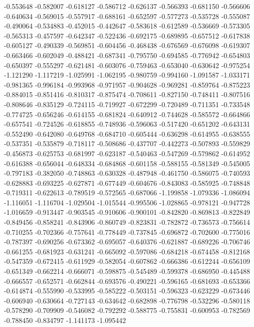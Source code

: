 -0.553648
-0.582007
-0.618127
-0.586712
-0.626137
-0.566393
-0.681150
-0.566606
-0.640634
-0.569015
-0.557917
-0.688161
-0.652597
-0.577273
-0.535728
-0.555087
-0.490064
-0.534883
-0.452015
-0.442647
-0.583618
-0.612589
-0.536669
-0.573305
-0.565313
-0.457597
-0.642347
-0.522436
-0.692175
-0.689895
-0.657512
-0.617838
-0.605127
-0.490339
-0.569851
-0.604456
-0.468438
-0.676569
-0.676098
-0.619307
-0.663466
-0.602049
-0.488421
-0.687341
-0.795750
-0.694585
-0.776942
-0.654803
-0.650397
-0.555297
-0.621481
-0.603076
-0.759463
-0.653040
-0.630642
-0.975254
-1.121290
-1.117219
-1.025991
-1.062195
-0.980759
-0.994160
-1.091587
-1.033171
-0.981365
-0.996184
-0.993968
-0.971957
-0.904628
-0.969281
-0.859764
-0.875223
-0.884015
-0.851416
-0.810317
-0.875474
-0.708611
-0.827150
-0.748411
-0.807516
-0.808646
-0.835129
-0.724115
-0.719927
-0.672299
-0.720489
-0.711351
-0.733548
-0.774725
-0.656246
-0.614155
-0.681824
-0.640912
-0.744628
-0.585572
-0.664866
-0.657541
-0.724526
-0.618855
-0.748936
-0.596063
-0.517420
-0.651202
-0.643131
-0.552490
-0.642080
-0.649768
-0.684710
-0.605444
-0.636298
-0.614955
-0.638555
-0.537351
-0.535879
-0.718117
-0.508686
-0.437707
-0.442273
-0.507893
-0.559829
-0.456873
-0.625753
-0.681997
-0.623187
-0.540463
-0.547269
-0.579862
-0.614952
-0.616388
-0.656044
-0.648334
-0.684868
-0.601158
-0.588155
-0.581349
-0.545005
-0.797183
-0.382050
-0.748863
-0.630328
-0.487948
-0.461750
-0.586075
-0.740593
-0.628883
-0.693225
-0.627871
-0.677449
-0.604676
-0.843083
-0.585925
-0.748848
-0.719311
-0.622613
-0.789519
-0.572565
-0.687066
-1.199858
-1.079336
-1.086094
-1.116051
-1.116704
-1.029504
-1.015544
-0.995506
-1.028865
-0.978121
-0.947728
-1.016659
-0.913447
-0.903545
-0.910606
-0.900101
-0.842820
-0.869813
-0.822849
-0.849456
-0.858241
-0.843906
-0.860749
-0.823831
-0.782872
-0.736573
-0.756614
-0.710255
-0.702366
-0.757641
-0.778449
-0.737845
-0.696872
-0.702600
-0.775016
-0.787397
-0.690256
-0.673362
-0.695057
-0.640376
-0.621887
-0.689226
-0.706746
-0.661255
-0.681923
-0.631241
-0.665092
-0.597086
-0.684218
-0.674458
-0.812168
-0.547359
-0.672415
-0.611929
-0.582054
-0.607862
-0.666386
-0.612244
-0.656109
-0.651349
-0.662214
-0.666071
-0.598875
-0.545489
-0.599378
-0.686950
-0.445488
-0.666557
-0.652571
-0.662844
-0.693576
-0.490221
-0.596165
-0.681693
-0.653366
-0.614874
-0.555990
-0.533995
-0.585222
-0.503151
-0.596323
-0.623229
-0.673446
-0.606940
-0.630664
-0.727143
-0.634642
-0.682898
-0.776798
-0.532296
-0.580118
-0.578290
-0.709909
-0.546082
-0.792292
-0.588775
-0.755831
-0.600953
-0.782569
-0.788450
-0.834797
-1.141173
-1.095442
